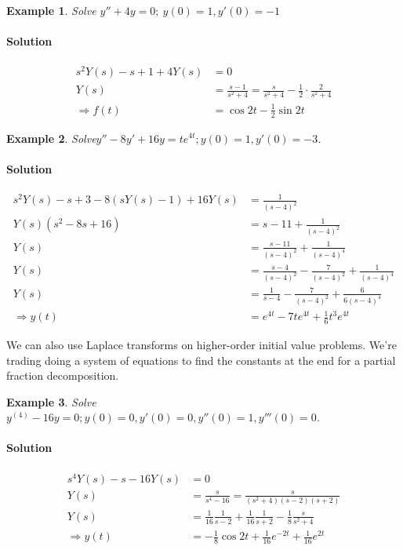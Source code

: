 \documentclass[letterpaper, 11pt, openany]{book}
\theoremstyle{mytheoremstyle}
\theoremstyle{myexamplestyle}
\newtheorem{example}{Example}[section]
\newenvironment{solution}{\paragraph{\sffamily \smaller \fontseries{b}\selectfont Solution}}{\hfill\faSquare}
\begin{document}
\begin{example}
    Solve \(y'' + 4y = 0; \ y(0) = 1, y'(0) = -1\)
    \begin{solution}
        \begin{align*}
            s^2 Y(s) - s + 1 + 4Y(s) &= 0\\
                       Y(s) &= \frac{s-1}{s^2 + 4} = \frac{s}{s^2 + 4} - \frac{1}{2} \cdot \frac{2}{s^2 + 4}\\
                       \Rightarrow f(t) &= \cos 2t - \frac{1}{2} \sin 2t
        \end{align*}
    \end{solution}
\end{example}

\begin{example}
    Solve\(y'' - 8y' + 16y = t e^{4t}; y(0) = 1, y'(0) = -3\).
    \begin{solution}
        \begin{align*}
            s^{2} Y(s) - s + 3 -8(sY(s) -1 ) +16Y(s) &= \frac{1}{(s-4)^{2}}\\
            Y(s) (s^{2} - 8s + 16) &= s-11 + \frac{1}{(s-4)^{2}}\\
            Y(s) &= \frac{s-11}{(s-4)^2} + \frac{1}{(s-4)^{4}}\\
            Y(s) &= \frac{s-4}{(s-4)^2} - \frac{7}{(s-4)^2} + \frac{1}{(s-4)^{4}}\\
            Y(s) &= \frac{1}{s-4} - \frac{7}{(s-4)^2} + \frac{6}{6(s-4)^{4}}\\
            \Rightarrow y(t) &= e^{4t} -7te^{4t} + \frac{1}{6} t^{3} e^{4t}
        \end{align*}
    \end{solution}
\end{example}

We can also use Laplace transforms on higher-order initial value problems. We're trading doing a system of equations to find the constants at the end for a partial fraction decomposition.

\begin{example}
    Solve \(y^{(4)} - 16y = 0; y(0) = 0, y'(0) = 0, y''(0) = 1, y'''(0) = 0\).
    \begin{solution}
        \begin{align*}
            s^{4}Y(s) - s - 16Y(s) &= 0\\
            Y(s) &= \frac{s}{s^{4} - 16} = \frac{s}{(s^{2}+ 4)(s-2)(s+2)}\\
            Y(s) &= \frac{1}{16} \frac{1}{s-2} + \frac{1}{16} \frac{1}{s+2} - \frac{1}{8} \frac{s}{s^{2} + 4}\\
            \Rightarrow y(t) &= -\frac{1}{8} \cos 2t + \frac{1}{16} e^{-2t} + \frac{1}{16} e^{2t}
        \end{align*}
    \end{solution}
\end{example}
\end{document}
